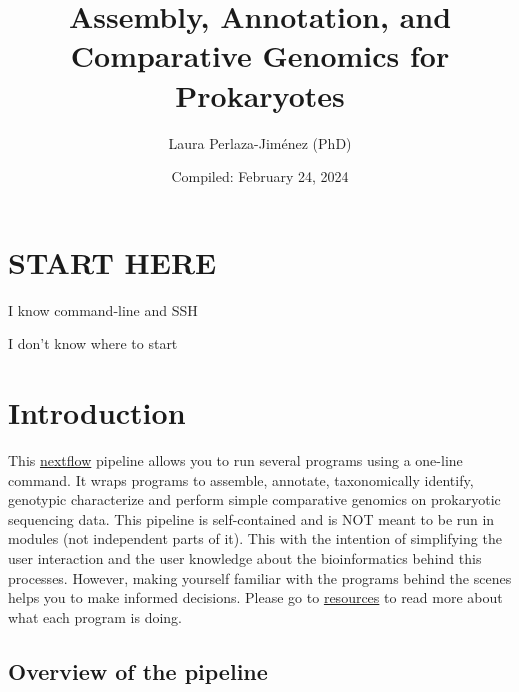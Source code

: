 \documentclass[
]{book}
\title{Assembly, Annotation, and Comparative Genomics for Prokaryotes}
\author{Laura Perlaza-Jiménez (PhD)}
\date{Compiled: February 24, 2024}
\begin{document}
\maketitle

{
\setcounter{tocdepth}{1}
\tableofcontents
}
\hypertarget{start-here}{%
\chapter{START HERE}\label{start-here}}

{I know command-line and SSH}

{I don't know where to start}

\hypertarget{introduction}{%
\chapter{Introduction}\label{introduction}}

This \href{https://www.nextflow.io/}{nextflow} pipeline allows you to run several programs using a one-line command. It wraps programs to assemble, annotate, taxonomically identify, genotypic characterize and perform simple comparative genomics on prokaryotic sequencing data. This pipeline is self-contained and is NOT meant to be run in modules (not independent parts of it). This with the intention of simplifying the user interaction and the user knowledge about the bioinformatics behind this processes. However, making yourself familiar with the programs behind the scenes helps you to make informed decisions. Please go to \href{resources.html}{resources} to read more about what each program is doing.

\hypertarget{overview-of-the-pipeline}{%
\section{Overview of the pipeline}\label{overview-of-the-pipeline}}
\end{document}
